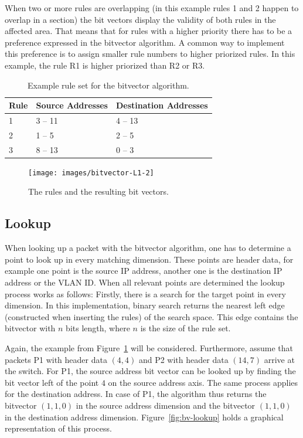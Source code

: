 \documentclass[a4paper,
		12pt,
		parskip=full,
		titlepage
		]{scrartcl}
\begin{document}
When two or more rules are overlapping (in this example rules 1 and 2 happen 
to overlap in a section) the bit vectors display the validity of both rules in the affected area.
That means that for rules with a higher priority there has to be a preference expressed in the bitvector algorithm.
A common way to implement this preference is to assign smaller rule numbers to higher priorized rules.
In this example, the rule R1 is higher priorized than R2 or R3.

\begin{table}
  \centering
  \begin{tabularx}{\textwidth}{l|X|X}
  Rule&Source Addresses&Destination Addresses\\
  \hline
  1&3 -- 11&4 -- 13\\
  2&1 -- 5&2 -- 5\\
  3&8 -- 13&0 -- 3\\
  \end{tabularx}
  \caption{Example rule set for the bitvector algorithm.}
  \label{table:bv_ruleset}
\end{table}

\begin{figure}
\centering
\texttt{[image: images/bitvector-L1-2]}
\caption{The rules and the resulting bit vectors.}
\label{fig:bv-normal}
\end{figure}

\subsection{Lookup}
When looking up a packet with the bitvector algorithm, one has to determine a point to look up in every matching dimension.
These points are header data, for example one point is the source IP address, another one is the destination IP address or the VLAN ID.
When all relevant points are determined the lookup process works as follows:
Firstly, there is a search for the target point in every dimension.
In this implementation, binary search returns the nearest left edge (constructed when inserting the rules) of the search space.
This edge contains the bitvector with $n$ bits length, where $n$ is the size of the rule set.

Again, the example from Figure~\ref{fig:bv-normal} will be considered.
Furthermore, assume that packets P1 with header data $(4, 4)$ and P2 with header data $(14, 7)$ arrive at the switch.
For P1, the source address bit vector can be looked up by finding the bit vector left of the point $4$ on the source address axis.
The same process applies for the destination address.
In case of P1, the algorithm thus returns the bitvector $(1, 1, 0)$ in the 
source address dimension and the bitvector $(1, 1, 0)$ in the destination address dimension.
Figure~\ref{fig:bv-lookup} holds a graphical representation of this process.
\end{document}
